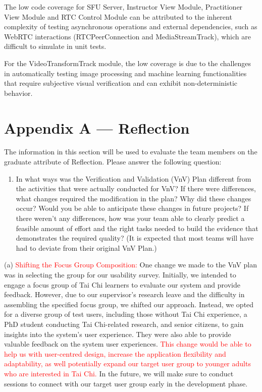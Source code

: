 \documentclass[12pt, titlepage]{article}
\newcommand{\rt}[1]{\textcolor{red}{#1}}
\begin{document}
The low code coverage for SFU Server, Instructor View Module, Practitioner View
Module and RTC Control Module can be attributed to the inherent complexity of
testing asynchronous operations and external dependencies, such as WebRTC
interactions (RTCPeerConnection and MediaStreamTrack), which are difficult to
simulate in unit tests.

For the VideoTransformTrack module, the low coverage is due to the challenges in
automatically testing image processing and machine learning functionalities that
require subjective visual verification and can exhibit non-deterministic
behavior.

\newpage{}
\section*{Appendix A --- Reflection}

The information in this section will be used to evaluate the team members on the
graduate attribute of Reflection.  Please answer the following question:

\begin{enumerate}
  \item In what ways was the Verification and Validation (VnV) Plan different
  from the activities that were actually conducted for VnV?  If there were
  differences, what changes required the modification in the plan?  Why did
  these changes occur?  Would you be able to anticipate these changes in future
  projects?  If there weren't any differences, how was your team able to clearly
  predict a feasible amount of effort and the right tasks needed to build the
  evidence that demonstrates the required quality?  (It is expected that most
  teams will have had to deviate from their original VnV Plan.)
\end{enumerate}

(a) \rt{Shifting the Focus Group Composition:}
One change we made to the VnV plan was in selecting the group for our
usability survey. Initially, we intended to engage a focus group of Tai Chi
learners to evaluate our system and provide feedback. However, due to our
supervisor's research leave and the difficulty in assembling the specified focus
group, we shifted our approach. Instead, we opted for a diverse group of test
users, including those without Tai Chi experience, a PhD student conducting Tai
Chi-related research, and senior citizens, to gain insights into the system's
user experience. They were also able to provide valuable feedback on the system
user experiences. \rt{This change would be able to help us with user-centred 
design, increase the application flexibility and adaptability, as well potentially 
expand our target user group to younger adults who are interested in Tai Chi.} 
In the future, we will make sure to conduct sessions to connect with our target 
user group early in the development phase.
\end{document}
